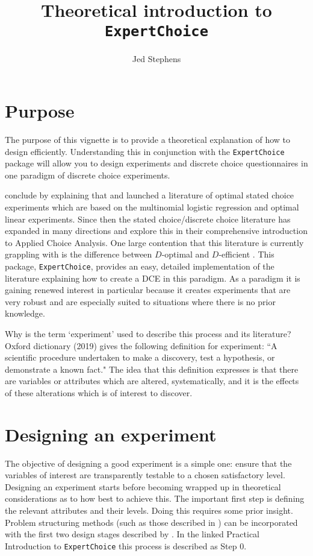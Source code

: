 \documentclass[article, crop=false]{standalone}
\title{Theoretical introduction to \texttt{ExpertChoice}}
\author{Jed Stephens}
\begin{document}
\maketitle
\section{Purpose}
The purpose of this vignette is to provide a theoretical explanation of how to design efficiently.
Understanding this in conjunction with the \texttt{ExpertChoice} package will allow you to design experiments and discrete choice questionnaires in one paradigm of discrete choice experiments.

\citet[287]{hensherrosegreene2015} conclude by explaining that \citet{burgess2005optimal} and \citet{street2007construction} launched a literature of optimal stated choice experiments which are based on the multinomial logistic regression and optimal linear experiments.
Since then the stated choice/discrete choice literature has expanded in many directions and \citet{hensherrosegreene2015} explore this in their comprehensive introduction to Applied Choice Analysis.
One large contention that this literature is currently grappling with is the difference between $D$-optimal and $D$-efficient \citep{rose2009efficient-stated-choice, walker2018d}.
This package, \texttt{ExpertChoice}, provides an easy, detailed implementation of the \citet{burgess2005optimal} literature explaining how to create a DCE in this paradigm.
As a paradigm it is gaining renewed interest in particular because it creates experiments that are very robust and are especially suited to situations where there is no prior knowledge.

Why is the term `experiment' used to describe this process and its literature?
Oxford dictionary (2019) gives the following definition for experiment: ``A scientific procedure undertaken to make a discovery, test a hypothesis, or demonstrate a known fact."
The idea that this definition expresses is that there are variables or attributes which are altered, systematically, and it is the effects of these alterations which is of interest to discover.

\section{Designing an experiment}

The objective of designing a good experiment is a simple one: ensure that the variables of interest are transparently testable to a chosen satisfactory level.
Designing an experiment starts before becoming wrapped up in theoretical considerations as to how best to achieve this.
The important first step is defining the relevant attributes and their levels.
Doing this requires some prior insight.
Problem structuring methods (such as those described in \citet{belton2002multiple}) can be incorporated with the first two design stages described by \citet[194-201]{hensherrosegreene2015}.
In the linked Practical Introduction to \texttt{ExpertChoice} this process is described as Step 0.
\end{document}
